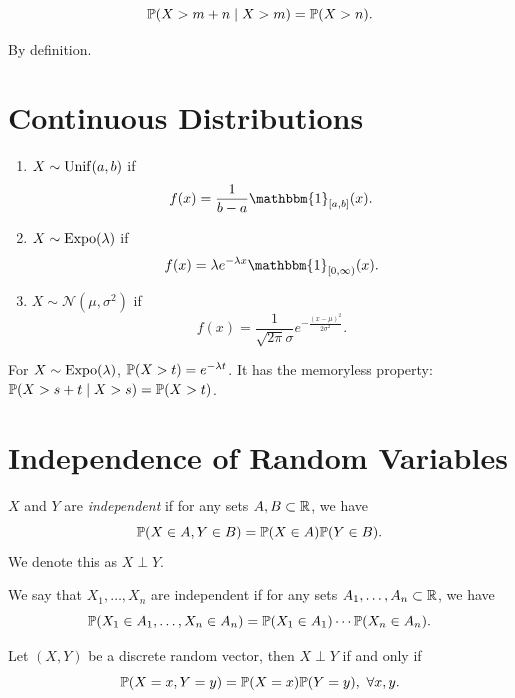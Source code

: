 \begin{propositionbox}
    $$\mathbb{P}(X > m + n \mid X > m) = \mathbb{P}(X > n).$$
\end{propositionbox}
\begin{proofbox}
    By definition.
\end{proofbox}

\section{Continuous Distributions}

\begin{definitionbox}
    \quad
    \begin{enumerate}
        \item $X \sim \operatorname{\mathrm{Unif}}(a,b)$ if $$f(x) = \frac{1}{b-a} \mathbbm{1}_{[a,b]}(x).$$
        \item $X \sim \operatorname{\mathrm{Expo}}(\lambda)$ if $$f(x) = \lambda e^{-\lambda x} \mathbbm{1}_{[0,\infty)}(x).$$
        \item $X \sim \mathcal{N}(\mu,\sigma^2)$ if $$f(x) = \frac{1}{\sqrt{2\pi}\sigma} e^{-\frac{(x-\mu)^2}{2\sigma^2}}.$$
    \end{enumerate}
\end{definitionbox}
\begin{remarkbox}
    For $X \sim \operatorname{\mathrm{Expo}}(\lambda)$, $\mathbb{P}(X > t) = e^{-\lambda t}$.
    It has the memoryless property: $\mathbb{P}(X > s + t \mid X > s) = \mathbb{P}(X > t)$.
\end{remarkbox}

\section{Independence of Random Variables}

\begin{definitionbox}
    $X$ and $Y$ are \emph{independent} if for any sets $A,B \subset \mathbb{R}$, we have
    $$\mathbb{P}(X \in A, Y \in B) = \mathbb{P}(X \in A) \mathbb{P}(Y \in B).$$
    We denote this as $X \perp Y$.

    We say that $X_1,\ldots, X_n$ are independent if for any sets $A_1,\ldots, A_n \subset \mathbb{R}$, we have
    $$\mathbb{P}(X_1 \in A_1, \ldots, X_n \in A_n) = \mathbb{P}(X_1 \in A_1) \cdots \mathbb{P}(X_n \in A_n).$$
\end{definitionbox}

\begin{propositionbox}
    Let $(X,Y)$ be a discrete random vector, then $X \perp Y$ if and only if
    $$\mathbb{P}(X = x, Y = y) = \mathbb{P}(X = x) \mathbb{P}(Y = y),\ \forall x,y.$$
\end{propositionbox}
